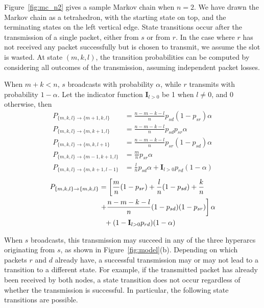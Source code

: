 \documentclass[journal, letterpaper]{IEEEtran}
\begin{document}
Figure~\ref{fig:mc_n2} gives a sample Markov chain when $n=2$. We have drawn the Markov chain as a tetrahedron, with the starting state on top, and the terminating states on the left vertical edge. State transitions occur after the transmission of a single packet, either from $s$ or from $r$. In the case where $r$ has not received any packet successfully but is chosen to transmit, we assume the slot is wasted. At state $(m,k,l)$, the transition probabilities can be computed by considering all outcomes of the transmission, assuming independent packet losses.

When $m+k < n$, $s$ broadcasts with probability $\alpha$, while $r$ transmits with probability $1-\alpha$. Let the indicator function $\mathbf{I}_{l>0}$ be 1 when $l\neq0$, and $0$ otherwise, then
\begin{align}
    P_{\{m,k,l\}\rightarrow\{m+1,k,l\}}   &= \frac{n-m-k-l}{n}p_{sd}(1-p_{sr})\alpha \label{eq:r1}\\
    P_{\{m,k,l\}\rightarrow\{m,k+1,l\}}   &= \frac{n-m-k-l}{n}p_{sd}p_{sr}\alpha \label{eq:r2}\\
    P_{\{m,k,l\}\rightarrow\{m,k,l+1\}}   &= \frac{n-m-k-l}{n}p_{sr}(1-p_{sd})\alpha \label{eq:r3}\\
    P_{\{m,k,l\}\rightarrow\{m-1,k+1,l\}} &= \frac{m}{n}p_{sr}\alpha\label{eq:r4} \\
    P_{\{m,k,l\}\rightarrow\{m,k+1,l-1\}} &= \frac{l}{n}p_{sd}\alpha+\mathbf{I}_{l>0}p_{rd}(1-\alpha)\label{eq:r5}
\end{align}
\begin{align}
    P_{\{m,k,l\}\rightarrow\{m,k,l\}}   &=  \left[\frac{m}{n}(1-p_{sr})+\frac{l}{n}(1-p_{sd})
     + \frac{k}{n} \right. \notag \\ & \left. + \frac{n-m-k-l}{n}(1-p_{sd})(1-p_{sr})\right]\alpha \notag \\
     & \hspace{.1in} + (1-\mathbf{I}_{l>0}p_{rd})(1-\alpha) \label{eq:r6}
\end{align}

When $s$ broadcasts, this transmission may succeed in any of the three hyperarcs originating from $s$, as shown in Figure~\ref{fig:model}(b). Depending on which packets $r$ and $d$ already have, a successful transmission may or may not lead to a transition to a different state. For example, if the transmitted packet has already been received by both nodes, a state transition does not occur regardless of whether the transmission is successful. In particular, the following state transitions are possible.
\end{document}
